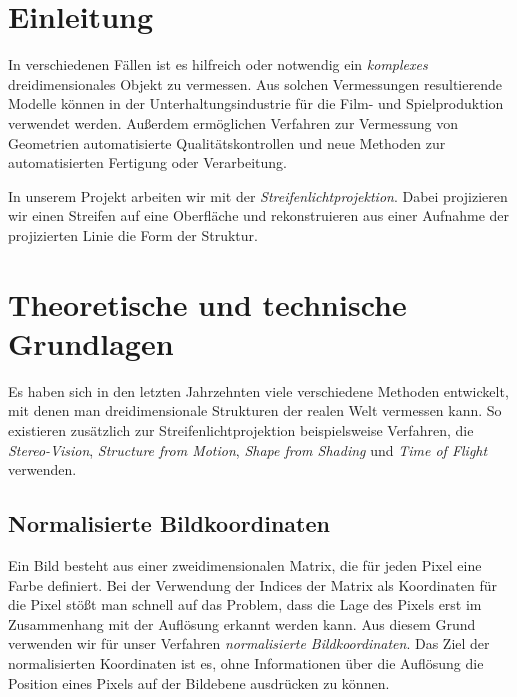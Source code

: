 \documentclass[ngerman,a4paper]{scrartcl}
\begin{document}


\tableofcontents
\newpage


\section{Einleitung}

In verschiedenen Fällen ist es hilfreich oder notwendig ein \emph{komplexes} dreidimensionales Objekt zu vermessen. Aus solchen Vermessungen resultierende Modelle können in der Unterhaltungsindustrie für die Film- und Spielproduktion verwendet werden. Außerdem ermöglichen Verfahren zur Vermessung von Geometrien automatisierte Qualitätskontrollen und neue Methoden zur automatisierten Fertigung oder Verarbeitung.

In unserem Projekt arbeiten wir mit der \emph{Streifenlichtprojektion}. Dabei projizieren wir einen Streifen auf eine Oberfläche und rekonstruieren aus einer Aufnahme der projizierten Linie die Form der Struktur.


\section{Theoretische und technische Grundlagen}

Es haben sich in den letzten Jahrzehnten viele verschiedene Methoden entwickelt, mit denen man dreidimensionale Strukturen der realen Welt vermessen kann. So existieren zusätzlich zur Streifenlichtprojektion beispielsweise Verfahren, die \emph{Stereo-Vision}, \emph{Structure from Motion}, \emph{Shape from Shading} und \emph{Time of Flight} verwenden.

\subsection{Normalisierte Bildkoordinaten}
\label{sec:imagecoordinates}

Ein Bild besteht aus einer zweidimensionalen Matrix, die für jeden Pixel eine Farbe definiert. Bei der Verwendung der Indices der Matrix als Koordinaten für die Pixel stößt man schnell auf das Problem, dass die Lage des Pixels erst im Zusammenhang mit der Auflösung erkannt werden kann. Aus diesem Grund verwenden wir für unser Verfahren \emph{normalisierte Bildkoordinaten}. Das Ziel der normalisierten Koordinaten ist es, ohne Informationen über die Auflösung die Position eines Pixels auf der Bildebene ausdrücken zu können.
\end{document}
